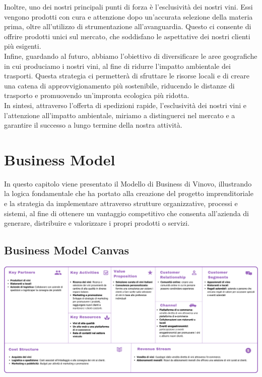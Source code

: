 \documentclass[12pt, a4paper]{article}
\newcommand{\meskip}{\medskip \\}
\newcommand{\bskip}{\bigskip \\}
\begin{document}
Inoltre, uno dei nostri principali punti di forza è l'esclusività dei nostri vini. Essi vengono prodotti con cura e attenzione dopo un'accurata selezione della materia prima, oltre all'utilizzo di strumentazione all'avanguardia. Questo ci consente di offrire prodotti unici sul mercato, che soddisfano le aspettative dei nostri clienti più esigenti.\meskip
Infine, guardando al futuro, abbiamo l'obiettivo di diversificare le aree geografiche in cui produciamo i nostri vini, al fine di ridurre l'impatto ambientale dei trasporti. Questa strategia ci permetterà di sfruttare le risorse locali e di creare una catena di approvvigionamento più sostenibile, riducendo le distanze di trasporto e promuovendo un'impronta ecologica più ridotta.\bskip
In sintesi, attraverso l'offerta di spedizioni rapide, l'esclusività dei nostri vini e l'attenzione all'impatto ambientale, miriamo a distinguerci nel mercato e a garantire il successo a lungo termine della nostra attività.

\section{Business Model}
In questo capitolo viene presentato il Modello di Business di Vinovo, illustrando la logica fondamentale che ha portato alla creazione del progetto imprenditoriale e la strategia da implementare attraverso strutture organizzative, processi e sistemi, al fine di ottenere un vantaggio competitivo che consenta all'azienda di generare, distribuire e valorizzare i propri prodotti o servizi.

\subsection{Business Model Canvas}
\includegraphics[width=\textwidth]{images/business_model_canvas.png}
\end{document}
